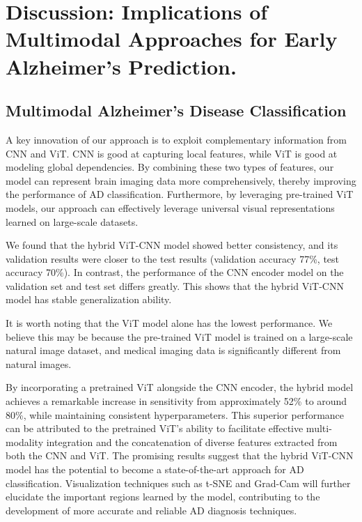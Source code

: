 \section{Discussion: Implications of Multimodal Approaches for Early Alzheimer’s Prediction.}
\label{sec:discussion}
\subsection{Multimodal Alzheimer's Disease Classification}
A key innovation of our approach is to exploit complementary information from CNN and ViT. CNN is good at capturing local features, while ViT is good at modeling global dependencies. By combining these two types of features, our model can represent brain imaging data more comprehensively, thereby improving the performance of AD classification. Furthermore, by leveraging pre-trained ViT models, our approach can effectively leverage universal visual representations learned on large-scale datasets. 

We found that the hybrid ViT-CNN model showed better consistency, and its validation results were closer to the test results (validation accuracy 77\%, test accuracy 70\%). In contrast, the performance of the CNN encoder model on the validation set and test set differs greatly. This shows that the hybrid ViT-CNN model has stable generalization ability. 

It is worth noting that the ViT model alone has the lowest performance. We believe this may be because the pre-trained ViT model is trained on a large-scale natural image dataset, and medical imaging data is significantly different from natural images. 

By incorporating a pretrained ViT alongside the CNN encoder, the hybrid model achieves a remarkable increase in sensitivity from approximately 52\% to around 80\%, while maintaining consistent hyperparameters. This superior performance can be attributed to the pretrained ViT's ability to facilitate effective multi-modality integration and the concatenation of diverse features extracted from both the CNN and ViT. The promising results suggest that the hybrid ViT-CNN model has the potential to become a state-of-the-art approach for AD classification. Visualization techniques such as t-SNE and Grad-Cam will further elucidate the important regions learned by the model, contributing to the development of more accurate and reliable AD diagnosis techniques. 

